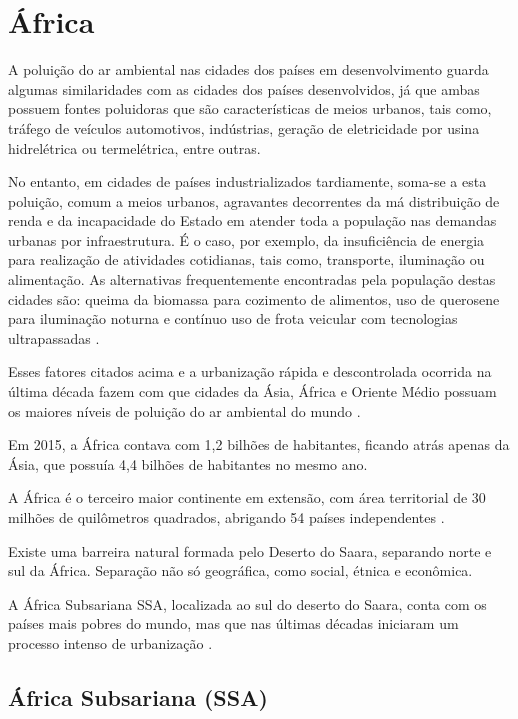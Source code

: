 \section{África}

A poluição do ar ambiental nas cidades dos países em desenvolvimento
guarda algumas similaridades com as cidades dos países desenvolvidos, já que 
ambas possuem fontes poluidoras que são características de meios urbanos, 
tais como, tráfego de veículos automotivos, indústrias, geração de 
eletricidade por usina hidrelétrica ou termelétrica, entre outras. 

No entanto, em cidades de países industrializados tardiamente, soma-se a esta 
poluição, comum a meios urbanos, agravantes decorrentes da má distribuição de renda e 
da incapacidade do Estado em atender toda a população nas demandas urbanas 
por infraestrutura. 
É o caso, por exemplo, da insuficiência de energia para realização de atividades cotidianas, 
tais como, transporte, iluminação ou alimentação. 
As alternativas frequentemente encontradas pela população destas cidades são: queima da 
biomassa para cozimento de alimentos, uso de querosene para iluminação 
noturna e contínuo uso de frota veicular com tecnologias ultrapassadas
\citep{brauer2012}.

Esses fatores citados acima e a urbanização rápida e descontrolada ocorrida na
última década fazem com que cidades da Ásia, África e Oriente Médio possuam 
os maiores níveis de poluição do ar ambiental do mundo \citep{brauer2012}.

Em 2015, a África contava com 1,2 bilhões de habitantes, ficando atrás 
apenas da Ásia, que possuía 4,4 bilhões de habitantes no mesmo ano.
 
A África é o terceiro maior continente em extensão, com área territorial 
de 30 milhões de quilômetros quadrados, abrigando 54 países independentes 
\citep{UN}.

Existe uma barreira natural formada pelo Deserto do Saara,
separando norte e sul da África. Separação não só geográfica, como
social, étnica e econômica. 

A África Subsariana SSA, localizada ao sul do deserto do Saara, conta com os 
países mais pobres do mundo, mas que 
nas últimas décadas iniciaram um processo intenso de urbanização \citep{UN}. 
   	
\subsection{África Subsariana \textbf{(SSA)}}

